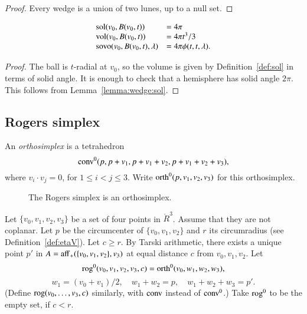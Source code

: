 \begin{proof} Every wedge is a union of two lunes, up to a null set.
\end{proof}

\begin{lemma}  
   $$
   \begin{array}{lll}
    {\operatorname{sol}}(v_0,B(v_0,t)) &= 4\pi\\
    {\operatorname{vol}}(v_0,B(v_0,t)) &= 4\pi t^3/3\\
    {\operatorname{sovo}}(v_0,B(v_0,t),\lambda) &= 4 \pi \phi(t,t,\lambda).
   \end{array}
   $$
\end{lemma}

\begin{proof}
The ball is $t$-radial at $v_0$, so the volume is given by
Definition~\ref{def:sol} in terms of solid angle.  It is enough
to check that a hemisphere has solid angle $2\pi$.  This follows
from Lemma~\ref{lemma:wedge:sol}.
\end{proof}  




\subsection{Rogers simplex}

\begin{definition} 
An {\it orthosimplex} is a tetrahedron
    $${\operatorname{conv}}^0(p,p+v_1,p+v_1+v_2,p+v_1+v_2+v_3),$$
where $v_i\cdot v_j=0$, for $1\le i<j\le 3$.   Write
${\operatorname{orth}}^0(p,v_1,v_2,v_3)$ for this orthosimplex.
\end{definition}

\begin{figure}[htb]
  \centering
  \caption{The Rogers simplex is an orthosimplex.}
\end{figure}


\begin{definition} 
Let $\{v_0,v_1,v_2,v_3\}$ be a set of four points in $\ring{R}^3$.
Assume that they are not coplanar.  Let $p$ be the circumcenter
of $\{v_0,v_1,v_2\}$ and $r$ its circumradius (see Definition~\ref{def:etaV}).  Let $c\ge r$.
By Tarski arithmetic, %
there exists a unique point $p'$ in $A={\operatorname{aff}}_+(\{v_0,v_1,v_2\},v_3)$ at equal distance $c$
from $v_0,v_1,v_2$.
Let 
$$
    {\operatorname{rog}}^0(v_0,v_1,v_2,v_3,c) = 
    {\operatorname{orth}}^0(v_0,w_1,w_2,w_3),
$$
$$
     w_1=(v_0+v_1)/2,\quad w_1+w_2=p,\quad w_1+w_2+w_3=p'.
$$
(Define ${\operatorname{rog}}(v_0,\ldots,v_3,c)$ similarly, with
${\operatorname{conv}}$ instead of ${\operatorname{conv}}^0$.)
Take ${\operatorname{rog}}^0$ to be the empty set, if $c< r$.
\end{definition}

